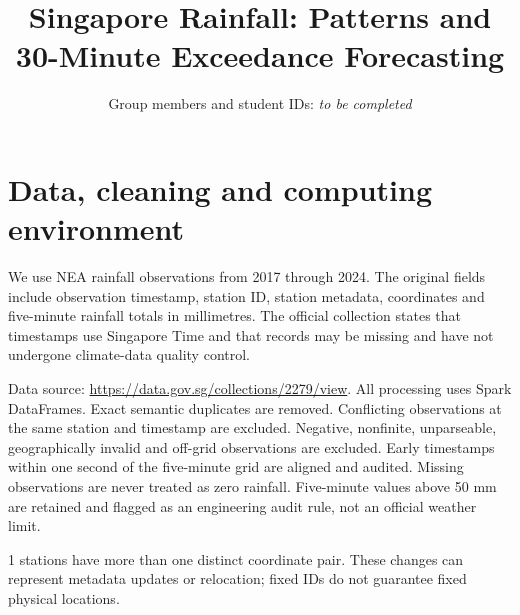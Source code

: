 \documentclass[11pt,a4paper]{article}
\title{Singapore Rainfall: Patterns and 30-Minute Exceedance Forecasting}
\author{Group members and student IDs: \textit{to be completed}}
\date{}
\begin{document}
\maketitle
\section{Data, cleaning and computing environment}
We use NEA rainfall observations from 2017 through 2024. The original fields include observation timestamp, station ID, station metadata, coordinates and five-minute rainfall totals in millimetres. The official collection states that timestamps use Singapore Time and that records may be missing and have not undergone climate-data quality control.

Data source: \url{https://data.gov.sg/collections/2279/view}.
All processing uses Spark DataFrames. Exact semantic duplicates are removed. Conflicting observations at the same station and timestamp are excluded. Negative, nonfinite, unparseable, geographically invalid and off-grid observations are excluded. Early timestamps within one second of the five-minute grid are aligned and audited. Missing observations are never treated as zero rainfall. Five-minute values above 50 mm are retained and flagged as an engineering audit rule, not an official weather limit.

\begin{table}[H]\centering\small
\caption{Record-level quality audit; off-grid counts include accepted one-second alignment.}
\end{table}
1 stations have more than one distinct coordinate pair. These changes can represent metadata updates or relocation; fixed IDs do not guarantee fixed physical locations.
\end{document}
